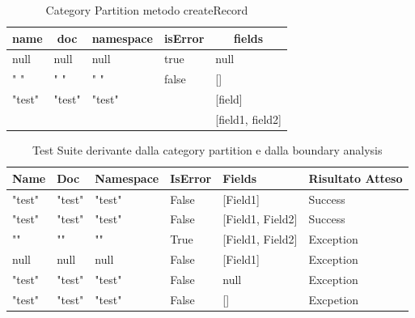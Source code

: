 \documentclass[12pt, a4paper]{article}
\begin{document}
\begin{table}[ht]
  \centering
  \caption[Schema - Category Partition]{Category Partition metodo createRecord}
  \begin{tabular}{|l|l|l|l|l|}
  \hline
  \multicolumn{1}{|c|}{\textbf{name}} & \multicolumn{1}{|c|}{\textbf{doc}} & \multicolumn{1}{|c|}{\textbf{namespace}} & 
  \multicolumn{1}{|c|}{\textbf{isError}} & \multicolumn{1}{|c|}{\textbf{fields}} \\
  \hline
  null & null & null & true & null \\
  \hdashline[4pt/2pt]
  " " & " " & " " & false & [] \\
  \hdashline[4pt/2pt]
  "test" & "test" & "test" & & [field] \\
  \hdashline[4pt/2pt]
  & & & & [field1, field2] \\
  \hline
  \end{tabular}
  \label{tab:BoundaryAnalysisCreateRecord}
\end{table}

\begin{table}[ht]
  \centering
  \caption[CreateRecord: Test Suite - Category partition]{Test Suite derivante dalla category partition e dalla boundary analysis}
  \begin{tabular}{|l|l|l|l|l|l|}
    \hline
    \textbf{Name} & \textbf{Doc} & \textbf{Namespace}  & \textbf{IsError} & \textbf{Fields} & \textbf{Risultato Atteso} \\
    \hline
    "test" & "test" & "test" & False & [Field1] & Success \\
    "test" & "test" & "test" & False & [Field1, Field2] & Success \\
    "" & "" & "" & True & [Field1, Field2] & Exception \\
    null & null & null & False & [Field1] & Exception \\
    "test" & "test" & "test" & False & null & Exception \\
    "test" & "test" & "test" & False & [] & Excpetion \\

    \hline
  \end{tabular}
  \label{tab:categoryPartition1CreateRecord}
\end{table}
\end{document}
